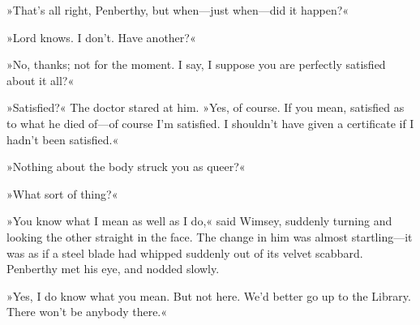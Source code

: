 »That's all right, Penberthy, but when\allowbreak---\allowbreak just when\allowbreak---\allowbreak did it happen?«

»Lord knows. I don't. Have another?«

»No, thanks; not for the moment. I say, I suppose you are perfectly satisfied about it all?«

»Satisfied?« The doctor stared at him. »Yes, of course. If you mean, satisfied as to what he died of\allowbreak---\allowbreak of course I'm satisfied. I shouldn't have given a certificate if I hadn't been satisfied.«

»Nothing about the body struck you as queer?«

»What sort of thing?«

»You know what I mean as well as I do,« said Wimsey, suddenly turning and looking the other straight in the face. The change in him was almost startling\allowbreak---\allowbreak it was as if a steel blade had whipped suddenly out of its velvet scabbard. Penberthy met his eye, and nodded slowly.

»Yes, I do know what you mean. But not here. We'd better go up to the Library. There won't be anybody there.«